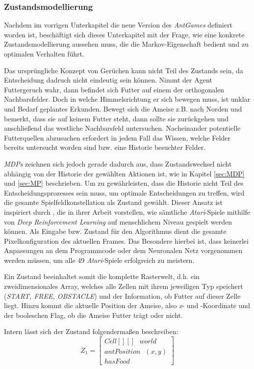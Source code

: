 \subsubsection{Zustandsmodellierung}
Nachdem im vorrigen Unterkapitel die neue Version des \textit{AntGames} definiert worden ist, beschäftigt sich dieses Unterkapitel mit der Frage, wie eine konkrete Zustandsmodellierung aussehen muss, die die Markov-Eigenschaft bedient und zu optimalen Verhalten führt.
\par 
Das ursprüngliche Konzept von \glqq Gerüchen\grqq{} kann nicht Teil des Zustands sein, da Entscheidung dadruch nicht eindeutig sein können. Nimmt der Agent Futtergeruch wahr, dann befindet sich Futter auf einem der orthogonalen Nachbarsfelder. Doch in welche Himmelsrichtung er sich bewegen muss, ist unklar und Bedarf geplantes Erkunden. Bewegt sich die Ameise z.B. nach Norden und bemerkt, dass sie auf keinem Futter steht, dann sollte sie zurückgehen und anschließend das westliche Nachbarsfeld untersuchen. Nacheinander potentielle Futterquellen abzusuchen erfordert in jedem Fall das Wissen, welche Felder bereits untersucht worden sind bzw. eine Historie besuchter Felder.
\par 
\textit{MDPs} zeichnen sich jedoch gerade dadurch aus, dass Zustandswechsel nicht abhängig von der Historie der gewählten Aktionen ist, wie in Kapitel \ref{sec:MDP} und \ref{sec:MP} beschrieben. Um zu gewährleisten, dass die Historie nicht Teil des Entscheidungsprozesses sein muss, um optimale Entscheidungen zu treffen, wird die gesamte Spielfeldkonstellation als Zustand gewählt. Dieser Ansatz ist inspiriert durch \cite{dqn}, die in ihrer Arbeit vorstellen, wie sämtliche \textit{Atari}-Spiele mithilfe von \textit{Deep Reinforcement Learning} auf menschlichem Niveau gespielt werden können. Als Eingabe bzw. Zustand für den Algorithmus dient die gesamte Pixelkonfiguration des aktuellen Frames. Das Besondere hierbei ist, dass keinerlei Anpassungen an dem Programmcode oder dem Neuronalen Netz vorgenommen werden müssen, um alle 49 \textit{Atari}-Spiele erfolgreich zu meistern.
\par 
Ein Zustand beeinhaltet somit die komplette Rasterwelt, d.h. ein zweidimensionales Array, welches alle Zellen mit ihrem jeweiligen Typ speichert (\textit{START, FREE, OBSTACLE}) und der Information, ob Futter auf dieser Zelle liegt. Hinzu kommt die aktuelle Position der Ameise, also \textit{x}- und \textit{}-Koordinate und der booleschen Flag, ob die Ameise Futter trägt oder nicht.
\par 
Intern lässt sich der Zustand folgendermaßen beschreiben:
\begin{equation}
Z_{1} =  \begin{bmatrix} Cell[][]\text{ }world\\
                         antPosition\text{ }(x,y) \\
                        hasFood  \end{bmatrix}
\end{equation}

